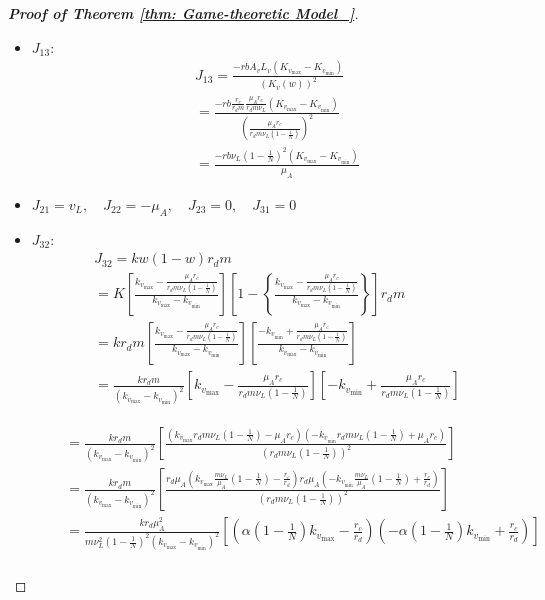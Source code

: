 \documentclass{article}
\theoremstyle{remark}
\theoremstyle{custom} %
\begin{document}
\begin{proof}[\textbf{Proof of Theorem \ref{thm: Game-theoretic Model_}}]
\begin{itemize}
\item $J_{13}:$
$$
\begin{aligned}
& J_{13}=\frac{-r b A_v L_v\left(K_{v_{\max }}-K_{v_{\min }}\right)}{\left(K_v(w)\right)^2} \\
& =\frac{-r b \frac{r_c}{r_d m} \frac{\mu_A r_c}{r_d m \nu_L}\left(K_{v_{\max }}-K_{v_{\min }}\right)}{\left(\frac{\mu_A r_c}{r_d m \nu_L\left(1-\frac{1}{N}\right)}\right)^2} \\
& =\frac{-r b \nu_L \left(1-\frac{1}{N}\right)^2\left(K_{v_{\max }}-K_{v_{\min }}\right)}{\mu_A}
\end{aligned}
$$

\item  $
J_{21}=v_L, \quad J_{22}=-\mu_A, \quad J_{23}=0, \quad J_{31}=0
$

\item $J_{32}:$
$$
\begin{aligned}
& J_{32}=k w (1-w) r_d m \\
& =K \left[\frac{k_{v_{\max }}-\frac{\mu_A r_c}{r_d m \nu_L\left(1-\frac{1}{N}\right)}}{k_{v_{\max }}-k_{v_{\min }}}\right] \left[1-\left\{\frac{k_{v_{\max }}-\frac{\mu_A r_c}{r_d m \nu_L\left(1-\frac{1}{N}\right)}}{k_{v_{\max }}-k_{v_{\min }}}\right\}\right] r_d m \\
& =k r_d m\left[\frac{k_{v_{\max }}-\frac{\mu_A r_c}{r_d m \nu_L\left(1-\frac{1}{N}\right)}}{k_{v_{\max }}-k_{v_{\min }}}\right]\left[\frac{-k_{v_{\min }}+\frac{\mu_A r_c}{r_d m \nu_L\left(1-\frac{1}{N}\right)}}{k_{v_{\max }}-k_{v_{\min }}}\right] \\
& =\frac{k r_d m}{\left(k_{v_{\max }}-k_{v_{\min }}\right)^2}\left[k_{v_{\max }}-\frac{\mu_A r_c}{r_d m \nu_L\left(1-\frac{1}{N}\right)}\right]\left[-k_{v_{\min }}+\frac{\mu_A r_c}{r_d m \nu_L\left(1-\frac{1}{N}\right)}\right]
\end{aligned}
$$

$$
\begin{aligned}
&\begin{aligned}
& =\frac{k r_d m}{\left(k_{v_{\max }}-k_{v_{\min }}\right)^2}\left[\frac{\left(k_{v_{\max }} r_d m \nu_L\left(1-\frac{1}{N}\right)-\mu_A r_c\right)\left(-k_{v_{\min }} r_d m \nu_L\left(1-\frac{1}{N}\right)+\mu_A r_c\right)}{\left(r_d m \nu_L\left(1-\frac{1}{N}\right)\right)^2}\right] \\
& =\frac{k r_d m}{\left(k_{v_{\max }}-k_{v_{\min }}\right)^2}\left[\frac{r_d \mu_A\left(k_{v_{\max }}\frac{m\nu_L}{\mu_A}\left(1-\frac{1}{N}\right)-\frac{r_c}{r_d}\right) r_d \mu_A\left(-k_{v_{\min }} \frac{m \nu_L}{\mu_A}\left(1-\frac{1}{N}\right)+\frac{r_c}{r_d}\right)}{\left(r_d m \nu_L\left(1-\frac{1}{N}\right)\right)^2}\right] \\
& \left.\left.=\frac{k r_d \mu_A^2}{m  \nu_L^2\left(1-\frac{1}{N}\right)^2\left(k_{v_{\max }}-k_{v_{\min }}\right)^2}\right.\right.\left[\left(\alpha \left(1-\frac{1}{N}\right) k_{v_{\max }}-\frac{r_c}{r_d}\right)\left(-\alpha \left(1-\frac{1}{N}\right) k_{v_{\min }}+\frac{r_c}{r_d}\right)\right]
\end{aligned}\\
\end{aligned}
$$


\end{itemize}
\end{proof}
\end{document}

